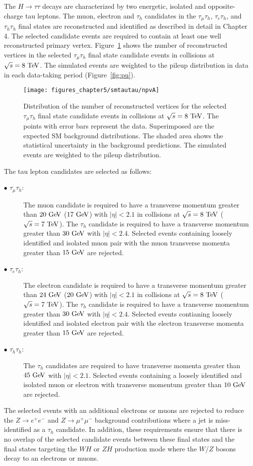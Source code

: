 The $H \rightarrow \tau\tau$ decays are characterized by two energetic, isolated and opposite-charge tau leptons. The muon, electron and $\tau_h$ candidates in the  $\tau_{\mu}\tau_{h}$, $\tau_{e}\tau_{h}$, and $\tau_{h}\tau_{h}$  final states are reconstructed and identified as described in detail in Chapter 4.  The selected candidate events are required to contain at least one well reconstructed primary vertex. Figure~\ref{fig:npv} shows the number of reconstructed vertices in the selected $\tau_{\mu}\tau_{h}$ final state candidate events in collisions at $\sqrt{s}=8~\mathrm{Te\kern -0.1em V}$. The simulated events are weighted to the pileup distribution in data in each data-taking period (Figure~\ref{fig:pu}). 
\begin{figure}[htbp]
\centering
\texttt{[image: figures\_chapter5/smtautau/npvA]}
\caption{Distribution of the number of reconstructed vertices for the selected $\tau_{\mu}\tau_{h}$ final state candidate events in collisions at $\sqrt{s}=8~\mathrm{Te\kern -0.1em V}$. The points with error bars represent the data. Superimposed are the expected SM background distributions. The shaded area shows the statistical uncertainty in the background predictions. The simulated events are weighted to the pileup distribution.}
\label{fig:npv}
\end{figure}
The tau lepton candidates are selected as follows:
\begin{description}
\item[$\bullet$ $\tau_{\mu}\tau_h$:] The muon candidate is required to have a transverse momentum greater than  $20~\mathrm{Ge\kern -0.1em V}$ ($17~\mathrm{Ge\kern -0.1em V}$) with $|\eta|<2.1$ in collisions at $\sqrt{s}=8~\mathrm{Te\kern -0.1em V}$ ($\sqrt{s}=7~\mathrm{Te\kern -0.1em V}$). The $\tau_h$ candidate is required to have a transverse momentum greater than $30~\mathrm{Ge\kern -0.1em V}$ with $|\eta|<2.4$. Selected events containing loosely identified and isolated muon pair with the muon transverse momenta greater than $15~\mathrm{Ge\kern -0.1em V}$ are rejected. 
\item[$\bullet$ $\tau_{e}\tau_h$:] The electron candidate is required to have a transverse momentum greater than  $24~\mathrm{Ge\kern -0.1em V}$ ($20~\mathrm{Ge\kern -0.1em V}$) with $|\eta|<2.1$ in collisions at $\sqrt{s}=8~\mathrm{Te\kern -0.1em V}$ ($\sqrt{s}=7~\mathrm{Te\kern -0.1em V}$). The $\tau_h$ candidate is required to have a transverse momentum greater than $30~\mathrm{Ge\kern -0.1em V}$ with $|\eta|<2.4$. Selected events contianing loosely identified and isolated electron pair with the electron transverse momenta greater than $15~\mathrm{Ge\kern -0.1em V}$ are rejected. 
\item[$\bullet$ $\tau_{h}\tau_h$:] The $\tau_h$ candidates are required to have transverse momenta greater than $45~\mathrm{Ge\kern -0.1em V}$ with $|\eta|<2.1$. Selected events containing a loosely identified and isolated muon or electron with transverse momentum greater than $10~\mathrm{Ge\kern -0.1em V}$ are rejected. 
\end{description}    
The selected events with an additional electrons or muons are rejected to reduce the $Z \rightarrow e^+e^-$ and $Z \rightarrow \mu^+\mu^-$ background contributions where a jet is miss-identified as a $\tau_h$ candidate. In addition, these requirements ensure that there is no overlap of the selected candidate events between these final states and the final states targeting the $WH$ or $ZH$ production mode where the $W$/$Z$ bosons decay to an electrons or muons.   

